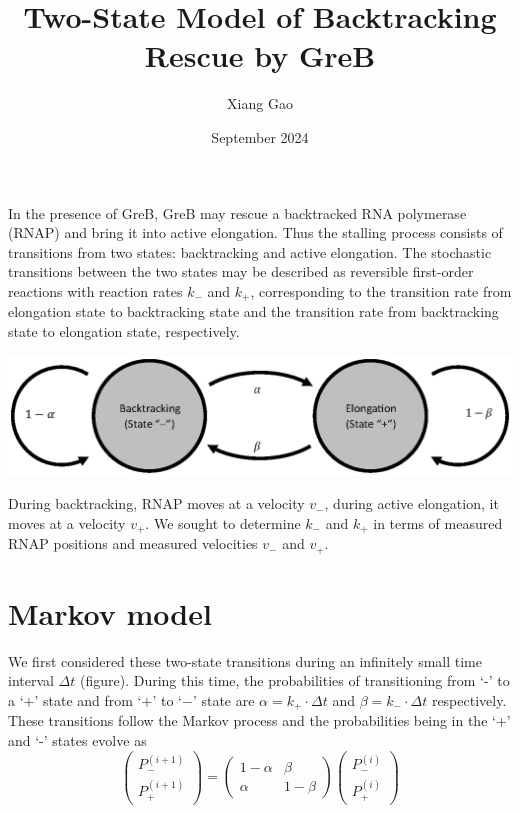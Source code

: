 \documentclass{article}
\title{Two-State Model of Backtracking Rescue by GreB}
\author{Xiang Gao}
\date{September 2024}
\begin{document}
\maketitle

In the presence of GreB, GreB may rescue a backtracked RNA polymerase (RNAP) and bring it into active elongation. Thus the stalling process consists of transitions from two states: backtracking and active elongation. The stochastic transitions between the two states may be described as reversible first-order reactions with reaction rates $k_-$ and $k_+$, corresponding to the transition rate from elongation state to backtracking state and the transition rate from backtracking state to elongation state, respectively. \\
\begin{center}
\includegraphics[scale=0.5]{si_figure_plain} \\
\end{center} 
During backtracking, RNAP moves at a velocity $v_-$, during active elongation, it moves at a velocity $v_+$. We sought to determine $k_-$ and $k_+$ in terms of measured RNAP positions and measured velocities $v_-$ and $v_+$. \\

\section{Markov model}
We first considered these two-state transitions during an infinitely small time interval ${\Delta}t$ (figure). During this time, the probabilities of transitioning from ‘-’ to a ‘+’ state and from ‘$+$’ to ‘$-$’ state are ${\alpha}=k_+{\cdot}{\Delta}t$ and ${\beta}=k_-{\cdot}{\Delta}t$ respectively. \\
These transitions follow the Markov process and the probabilities being in the ‘+’ and ‘-’ states evolve as \\

\begin{equation}
    \begin{pmatrix} P_-^{(i+1)} \\ P_+^{(i+1)} \end{pmatrix} 
    = 
    \begin{pmatrix} 1 - \alpha & \beta \\ \alpha & 1 - \beta \end{pmatrix} 
    \begin{pmatrix} P_-^{(i)} \\ P_+^{(i)} \end{pmatrix}
\end{equation}  \\
\end{document}
